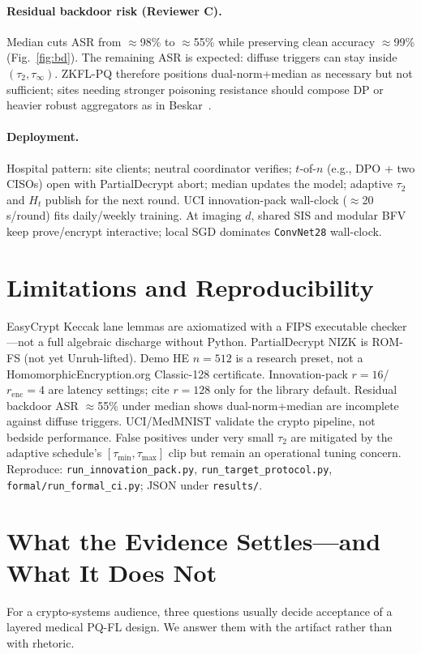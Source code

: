 \documentclass[conference]{IEEEtran}
\begin{document}
\paragraph{Residual backdoor risk (Reviewer C).}
Median cuts ASR from $\approx$98\% to $\approx$55\% while preserving clean accuracy $\approx$99\% (Fig.~\ref{fig:bd}). The remaining ASR is expected: diffuse triggers can stay inside $(\tau_2,\tau_\infty)$. ZKFL-PQ therefore positions dual-norm+median as necessary but not sufficient; sites needing stronger poisoning resistance should compose DP or heavier robust aggregators as in Beskar~\cite{zhang2025beskar}.

\paragraph{Deployment.}
Hospital pattern: site clients; neutral coordinator verifies; $t$-of-$n$ (e.g., DPO + two CISOs) open with PartialDecrypt abort; median updates the model; adaptive $\tau_2$ and $H_t$ publish for the next round. UCI innovation-pack wall-clock ($\approx$20\,s/round) fits daily/weekly training. At imaging $d$, shared SIS and modular BFV keep prove/encrypt interactive; local SGD dominates \texttt{ConvNet28} wall-clock.

\section{Limitations and Reproducibility}
EasyCrypt Keccak lane lemmas are axiomatized with a FIPS executable checker---not a full algebraic discharge without Python. PartialDecrypt NIZK is ROM-FS (not yet Unruh-lifted). Demo HE $n{=}512$ is a research preset, not a HomomorphicEncryption.org Classic-128 certificate. Innovation-pack $r{=}16$/$r_{\mathrm{enc}}{=}4$ are latency settings; cite $r{=}128$ only for the library default. Residual backdoor ASR $\approx$55\% under median shows dual-norm+median are incomplete against diffuse triggers. UCI/MedMNIST validate the crypto pipeline, not bedside performance. False positives under very small $\tau_2$ are mitigated by the adaptive schedule's $[\tau_{\min},\tau_{\max}]$ clip but remain an operational tuning concern. Reproduce: \texttt{run\_innovation\_pack.py}, \texttt{run\_target\_protocol.py}, \texttt{formal/run\_formal\_ci.py}; JSON under \texttt{results/}.

\section{What the Evidence Settles---and What It Does Not}
For a crypto-systems audience, three questions usually decide acceptance of a layered medical PQ-FL design. We answer them with the artifact rather than with rhetoric.
\end{document}
